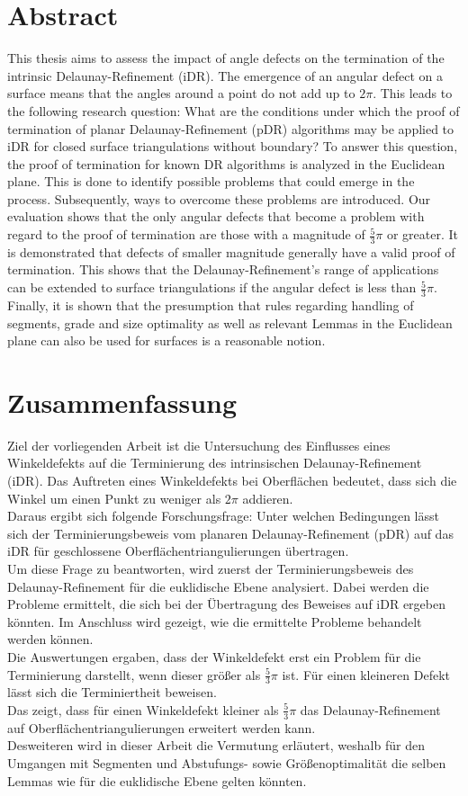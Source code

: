 \chapter*{Abstract}
This thesis aims to assess the impact of angle defects on the termination of the intrinsic Delaunay-Refinement (iDR). The emergence of an angular defect on a surface means that the angles around a point do not add up to $2\pi$. This leads to the following research question: What are the conditions under which the proof of termination of planar Delaunay-Refinement (pDR) algorithms may be applied to iDR for closed surface triangulations without boundary? To answer this question, the proof of termination for known DR algorithms is analyzed in the Euclidean plane. This is done to identify possible problems that could emerge in the process. Subsequently, ways to overcome these problems are introduced. Our evaluation shows that the only angular defects that become a problem with regard to the proof of termination are those with a magnitude of $\frac{5}{3}\pi$ or greater. It is demonstrated that defects of smaller magnitude generally have a valid proof of termination. This shows that the Delaunay-Refinement’s range of applications can be extended to surface triangulations if the angular defect is less than $\frac{5}{3}\pi$. Finally, it is shown that the presumption that rules regarding handling of segments, grade and size optimality as well as relevant Lemmas in the Euclidean plane can also be used for surfaces is a reasonable notion.

\chapter*{Zusammenfassung}
Ziel der vorliegenden Arbeit ist die Untersuchung des Einflusses eines Winkeldefekts auf die Terminierung des intrinsischen Delaunay-Refinement (iDR).  Das Auftreten eines Winkeldefekts bei Oberflächen bedeutet, dass sich die Winkel um einen Punkt zu weniger als  $2\pi$ addieren. \\
    Daraus ergibt sich folgende Forschungsfrage: Unter welchen Bedingungen lässt sich der Terminierungsbeweis vom planaren Delaunay-Refinement (pDR)  auf das iDR für geschlossene Oberflächentriangulierungen  übertragen.\\
    Um diese Frage zu beantworten, wird zuerst der Terminierungsbeweis des Delaunay-Refinement für die euklidische Ebene analysiert. Dabei werden die Probleme ermittelt, die sich bei der Übertragung des Beweises auf iDR ergeben könnten.
 Im Anschluss wird gezeigt, wie die ermittelte Probleme behandelt werden können.\\
    Die Auswertungen ergaben, dass der Winkeldefekt erst ein Problem für die Terminierung darstellt, wenn dieser größer als $\frac{5}{3}\pi$  ist. Für einen kleineren Defekt lässt sich die Terminiertheit beweisen.\\
    Das zeigt, dass für einen Winkeldefekt kleiner als $\frac{5}{3} \pi$ das Delaunay-Refinement auf Oberflächentriangulierungen erweitert werden kann.\\
    Desweiteren wird in dieser Arbeit die Vermutung erläutert, weshalb für den Umgangen mit Segmenten und Abstufungs- sowie Größenoptimalität die selben Lemmas wie für die euklidische Ebene gelten könnten.